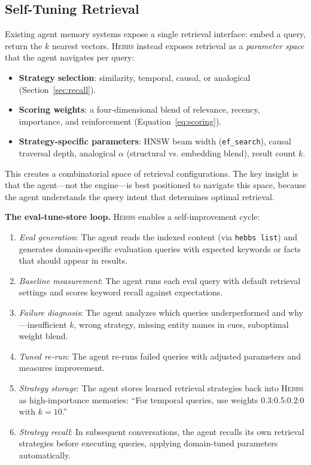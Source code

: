 \documentclass{article}
\begin{document}
\subsection{Self-Tuning Retrieval}
\label{sec:selftune}

Existing agent memory systems expose a single retrieval interface: embed a query, return the $k$ nearest vectors. \textsc{Hebbs} instead exposes retrieval as a \emph{parameter space} that the agent navigates per query:

\begin{itemize}
    \item \textbf{Strategy selection}: similarity, temporal, causal, or analogical (Section~\ref{sec:recall}).
    \item \textbf{Scoring weights}: a four-dimensional blend of relevance, recency, importance, and reinforcement (Equation~\ref{eq:scoring}).
    \item \textbf{Strategy-specific parameters}: HNSW beam width (\texttt{ef\_search}), causal traversal depth, analogical $\alpha$ (structural vs. embedding blend), result count $k$.
\end{itemize}

This creates a combinatorial space of retrieval configurations. The key insight is that the agent---not the engine---is best positioned to navigate this space, because the agent understands the query intent that determines optimal retrieval.

\textbf{The eval-tune-store loop.} \textsc{Hebbs} enables a self-improvement cycle:

\begin{enumerate}
    \item \emph{Eval generation}: The agent reads the indexed content (via \texttt{hebbs list}) and generates domain-specific evaluation queries with expected keywords or facts that should appear in results.
    \item \emph{Baseline measurement}: The agent runs each eval query with default retrieval settings and scores keyword recall against expectations.
    \item \emph{Failure diagnosis}: The agent analyzes which queries underperformed and why---insufficient $k$, wrong strategy, missing entity names in cues, suboptimal weight blend.
    \item \emph{Tuned re-run}: The agent re-runs failed queries with adjusted parameters and measures improvement.
    \item \emph{Strategy storage}: The agent stores learned retrieval strategies back into \textsc{Hebbs} as high-importance memories: ``For temporal queries, use weights 0.3:0.5:0.2:0 with $k{=}10$.''
    \item \emph{Strategy recall}: In subsequent conversations, the agent recalls its own retrieval strategies before executing queries, applying domain-tuned parameters automatically.
\end{enumerate}
\end{document}
